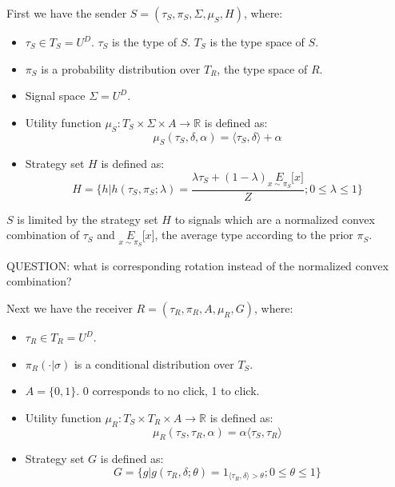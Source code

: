 \documentclass{article}
\begin{document}
First we have the sender $S = (\tau_S, \pi_S, \Sigma, \mu_S, H)$, where:
\begin{itemize}
	\item $\tau_S \in T_S = U^D$. $\tau_S$ is the type of $S$. $T_S$ is the type space of $S$.
	\item $\pi_S$ is a probability distribution over $T_R$, the type space of $R$.
	\item Signal space $\Sigma = U^D$.
	\item Utility function $\mu_S: T_S \times \Sigma \times A \rightarrow \mathbb{R}$ is defined as:
	\begin{equation}
		\mu_S(\tau_S, \delta, \alpha) = \langle \tau_S, \delta \rangle + \alpha
	\end{equation}
	\item Strategy set $H$ is defined as:
	\begin{equation}
		H = \lbrace h | h(\tau_S, \pi_S; \lambda) = \frac{\lambda \tau_S + (1-\lambda)\underset{x\sim\pi_S}{E}\lbrack x \rbrack}{Z}; 0 \le \lambda \le 1 \rbrace
	\end{equation}
\end{itemize}

\noindent $S$ is limited by the strategy set $H$ to signals which are a normalized convex combination of $\tau_S$ and $\underset{x\sim\pi_S}{E}\lbrack x \rbrack$, the average type according to the prior $\pi_S$.

QUESTION: what is corresponding rotation instead of the normalized convex combination?

\noindent Next we have the receiver $R = (\tau_R, \pi_R, A, \mu_R, G)$, where:
\begin{itemize}
	\item $\tau_R \in T_R = U^D$.
	\item $\pi_R(\cdot|\sigma)$ is a conditional distribution over $T_S$.
	\item $A = \lbrace 0,1 \rbrace$. 0 corresponds to no click, 1 to click.
	\item Utility function $\mu_R: T_S \times T_R \times A \rightarrow \mathbb{R}$ is defined as:
	\begin{equation}
		\mu_R(\tau_S, \tau_R, \alpha) = \alpha \langle \tau_S, \tau_R \rangle
	\end{equation}
	\item Strategy set $G$ is defined as:
	\begin{equation}
		G = \lbrace g | g(\tau_R, \delta; \theta) = 1_{\langle \tau_R, \delta \rangle > \theta}; 0 \le \theta \le 1 \rbrace
	\end{equation}
\end{itemize}
\end{document}
